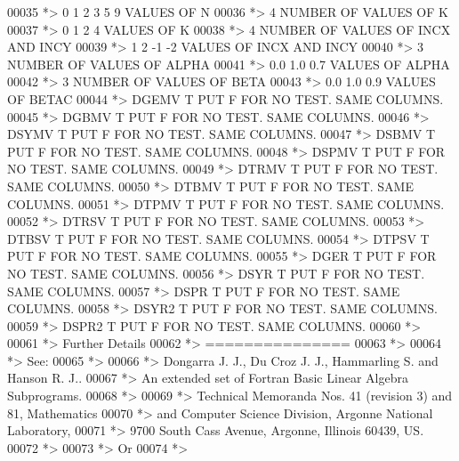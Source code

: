 \begin{DoxyCode}
00035 \textcolor{comment}{*> 0 1 2 3 5 9       VALUES OF N}
00036 \textcolor{comment}{*> 4                 NUMBER OF VALUES OF K}
00037 \textcolor{comment}{*> 0 1 2 4           VALUES OF K}
00038 \textcolor{comment}{*> 4                 NUMBER OF VALUES OF INCX AND INCY}
00039 \textcolor{comment}{*> 1 2 -1 -2         VALUES OF INCX AND INCY}
00040 \textcolor{comment}{*> 3                 NUMBER OF VALUES OF ALPHA}
00041 \textcolor{comment}{*> 0.0 1.0 0.7       VALUES OF ALPHA}
00042 \textcolor{comment}{*> 3                 NUMBER OF VALUES OF BETA}
00043 \textcolor{comment}{*> 0.0 1.0 0.9       VALUES OF BETAC}
00044 \textcolor{comment}{*> DGEMV  T PUT F FOR NO TEST. SAME COLUMNS.}
00045 \textcolor{comment}{*> DGBMV  T PUT F FOR NO TEST. SAME COLUMNS.}
00046 \textcolor{comment}{*> DSYMV  T PUT F FOR NO TEST. SAME COLUMNS.}
00047 \textcolor{comment}{*> DSBMV  T PUT F FOR NO TEST. SAME COLUMNS.}
00048 \textcolor{comment}{*> DSPMV  T PUT F FOR NO TEST. SAME COLUMNS.}
00049 \textcolor{comment}{*> DTRMV  T PUT F FOR NO TEST. SAME COLUMNS.}
00050 \textcolor{comment}{*> DTBMV  T PUT F FOR NO TEST. SAME COLUMNS.}
00051 \textcolor{comment}{*> DTPMV  T PUT F FOR NO TEST. SAME COLUMNS.}
00052 \textcolor{comment}{*> DTRSV  T PUT F FOR NO TEST. SAME COLUMNS.}
00053 \textcolor{comment}{*> DTBSV  T PUT F FOR NO TEST. SAME COLUMNS.}
00054 \textcolor{comment}{*> DTPSV  T PUT F FOR NO TEST. SAME COLUMNS.}
00055 \textcolor{comment}{*> DGER   T PUT F FOR NO TEST. SAME COLUMNS.}
00056 \textcolor{comment}{*> DSYR   T PUT F FOR NO TEST. SAME COLUMNS.}
00057 \textcolor{comment}{*> DSPR   T PUT F FOR NO TEST. SAME COLUMNS.}
00058 \textcolor{comment}{*> DSYR2  T PUT F FOR NO TEST. SAME COLUMNS.}
00059 \textcolor{comment}{*> DSPR2  T PUT F FOR NO TEST. SAME COLUMNS.}
00060 \textcolor{comment}{*>}
00061 \textcolor{comment}{*> Further Details}
00062 \textcolor{comment}{*> ===============}
00063 \textcolor{comment}{*>}
00064 \textcolor{comment}{*>    See:}
00065 \textcolor{comment}{*>}
00066 \textcolor{comment}{*>       Dongarra J. J., Du Croz J. J., Hammarling S.  and Hanson R. J..}
00067 \textcolor{comment}{*>       An  extended  set of Fortran  Basic Linear Algebra Subprograms.}
00068 \textcolor{comment}{*>}
00069 \textcolor{comment}{*>       Technical  Memoranda  Nos. 41 (revision 3) and 81,  Mathematics}
00070 \textcolor{comment}{*>       and  Computer Science  Division,  Argonne  National Laboratory,}
00071 \textcolor{comment}{*>       9700 South Cass Avenue, Argonne, Illinois 60439, US.}
00072 \textcolor{comment}{*>}
00073 \textcolor{comment}{*>       Or}
00074 \textcolor{comment}{*>}

\end{DoxyCode}

